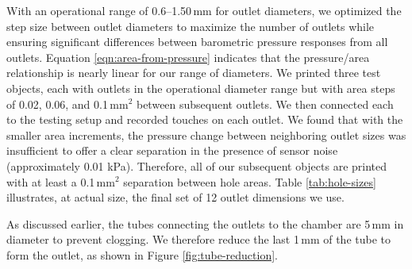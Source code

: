				With an operational range of 0.6--1.50\,mm for outlet diameters, we
				optimized the step size between outlet diameters to maximize the number
				of outlets while ensuring significant differences between barometric
				pressure responses from all outlets. Equation
				\ref{eqn:area-from-pressure} indicates that the pressure/area
				relationship is nearly linear for our range of diameters. We printed
				three test objects, each with outlets in the operational diameter range
				but with area steps of 0.02, 0.06, and 0.1\,mm$^2$ between subsequent
				outlets. We then connected each to the testing setup and recorded
				touches on each outlet. We found that with the smaller area increments,
				the pressure change between neighboring outlet sizes was insufficient to
				offer a clear separation in the presence of sensor noise (approximately
				0.01 kPa). Therefore, all of our subsequent objects are printed with at
				least a 0.1\,mm$^2$ separation between hole areas. Table
				\ref{tab:hole-sizes} illustrates, at actual size, the final set of 12
				outlet dimensions we use.
            
				As discussed earlier, the tubes connecting the outlets to the chamber
				are 5\,mm in diameter to prevent clogging. We therefore reduce the last
				1\,mm of the tube to form the outlet, as shown in Figure
				\ref{fig:tube-reduction}.        


